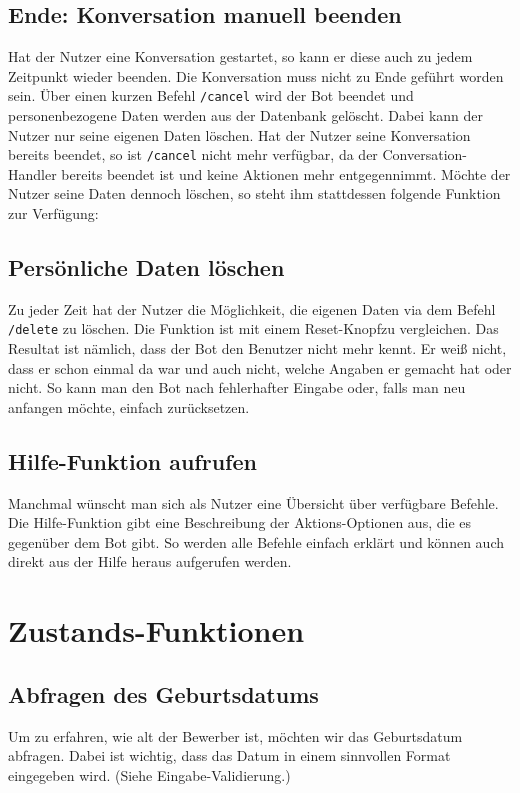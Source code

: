         \subsection{Ende: Konversation manuell beenden}
            Hat der Nutzer eine Konversation gestartet, so kann er diese auch zu jedem Zeitpunkt wieder beenden. Die Konversation muss nicht zu Ende geführt worden sein. Über einen kurzen Befehl \verb|/cancel| wird der Bot beendet und personenbezogene Daten werden aus der Datenbank gelöscht. Dabei kann der Nutzer nur seine eigenen Daten löschen. Hat der Nutzer seine Konversation bereits beendet, so ist \verb|/cancel| nicht mehr verfügbar, da der Conversation-Handler bereits beendet ist und keine Aktionen mehr entgegennimmt. Möchte der Nutzer seine Daten dennoch löschen, so steht ihm stattdessen folgende Funktion zur Verfügung: 

        \subsection{Persönliche Daten löschen}
            Zu jeder Zeit hat der Nutzer die Möglichkeit, die eigenen Daten via dem Befehl \verb|/delete| zu löschen. Die Funktion ist mit einem \glqq Reset-Knopf\grqq  zu vergleichen. Das Resultat ist nämlich, dass der Bot den Benutzer nicht mehr kennt. Er weiß nicht, dass er schon einmal da war und auch nicht, welche Angaben er gemacht hat oder nicht. So kann man den Bot nach fehlerhafter Eingabe oder, falls man neu anfangen möchte, einfach zurücksetzen.

        \subsection{Hilfe-Funktion aufrufen}
            Manchmal wünscht man sich als Nutzer eine Übersicht über verfügbare Befehle. Die Hilfe-Funktion gibt eine Beschreibung der Aktions-Optionen aus, die es gegenüber dem Bot gibt. So werden alle Befehle einfach erklärt und können auch direkt aus der Hilfe heraus aufgerufen werden. 

            
    \section{Zustands-Funktionen}
        
        \subsection{Abfragen des Geburtsdatums}    
        Um zu erfahren, wie alt der Bewerber ist, möchten wir das Geburtsdatum abfragen. Dabei ist wichtig, dass das Datum in einem sinnvollen Format eingegeben wird. (Siehe Eingabe-Validierung.)
        
